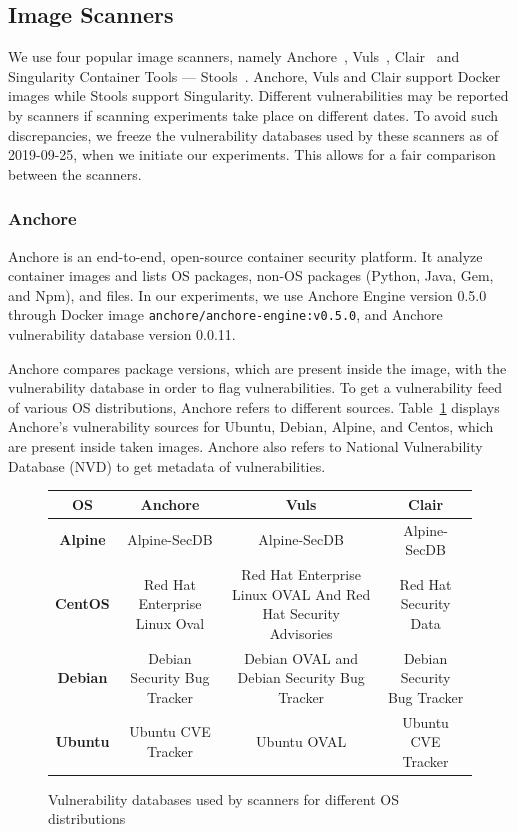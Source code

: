 \documentclass[a4paper,num-refs]{oup-contemporary}
\begin{document}
\subsection{Image Scanners}

We use four popular image scanners, namely Anchore~\cite{github_2019},
Vuls~\cite{future-architect_2019}, Clair~\cite{arminc_2019} and
Singularity Container Tools --- Stools~\cite{stools}. Anchore, Vuls and Clair support Docker
images while Stools support Singularity. Different vulnerabilities may be
reported by scanners if scanning experiments take place on different dates.
To avoid such discrepancies, we freeze the vulnerability
databases used by these scanners as of 2019-09-25, when we initiate our
experiments. This allows for a fair comparison between the scanners.

\subsubsection{Anchore}

Anchore is an end-to-end, open-source container security platform. It
analyze	container images and lists OS
packages, non-OS packages (Python, Java, Gem, and Npm), and files.
In our experiments, we use Anchore Engine version 0.5.0 through Docker image \texttt{anchore/anchore-engine:v0.5.0}, and
Anchore vulnerability database version 0.0.11.

Anchore compares package versions, which are present inside the
image, with the vulnerability database in order to flag vulnerabilities.
To get a vulnerability feed of various OS distributions, Anchore refers to
different sources. Table~\ref{database} displays Anchore's vulnerability sources for
Ubuntu, Debian, Alpine, and Centos, which are present inside taken images.
Anchore also refers to National
Vulnerability Database (NVD) to get metadata of vulnerabilities.

\begin{figure}
\begin{tabular}{ |c|c|c|c| }
 \hline
\textbf{OS} &	\textbf{Anchore} &	\textbf{Vuls} &	\textbf{Clair} \\
\hline
	\textbf{Alpine} & Alpine-SecDB &	Alpine-SecDB &	Alpine-SecDB \\
\hline
	\textbf{CentOS} & Red Hat Enterprise Linux Oval & Red Hat Enterprise Linux OVAL And Red Hat Security Advisories & Red Hat Security Data \\
\hline
	\textbf{Debian} & Debian Security Bug Tracker &	Debian OVAL and Debian Security Bug Tracker & Debian Security Bug Tracker \\
\hline
	\textbf{Ubuntu} & Ubuntu CVE Tracker &	Ubuntu OVAL &	Ubuntu CVE Tracker \\
 \hline
\end{tabular}
\caption{Vulnerability databases used by scanners for different OS distributions}
\label{database}
\end{figure}
\end{document}
